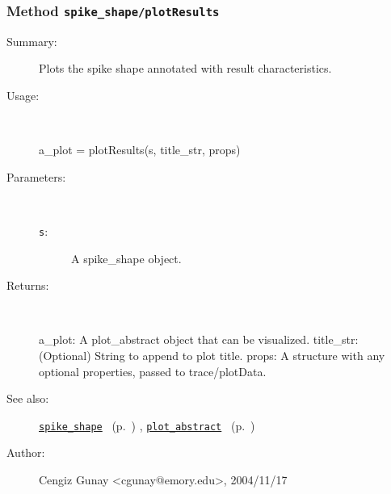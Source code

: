 \subsubsection[Method \texttt{plotResults}]{Method \texttt{spike\_shape/plotResults}}%
%
\label{ref_spike_shape__plotResults}%
\hypertarget{ref_spike_shape__plotResults}{}%
\begin{description}
\item[Summary:]Plots the spike shape annotated with result characteristics.
%
\item[Usage:]~%
\begin{lyxcode}%
a\_plot = plotResults(s, title\_str, props)
%
\end{lyxcode}%
%
%
\item[Parameters:]~
\begin{description}%
\item[\texttt{s}:]
 A spike\_shape object.
\end{description}%
%
\item[Returns:]~

	a\_plot: A plot\_abstract object that can be visualized.
	title\_str: (Optional) String to append to plot title.
	props: A structure with any optional properties, passed to trace/plotData.
%
%
\item[See also:]%
\hyperlink{ref_spike_shape}{\texttt{spike\_shape}}%
\ (p.~\pageref{ref_spike_shape})%
%
, \hyperlink{ref_plot_abstract}{\texttt{plot\_abstract}}%
\ (p.~\pageref{ref_plot_abstract})%
%
%
\item[Author:]%
Cengiz Gunay <cgunay@emory.edu>, 2004/11/17%
\end{description}
\methodline%
